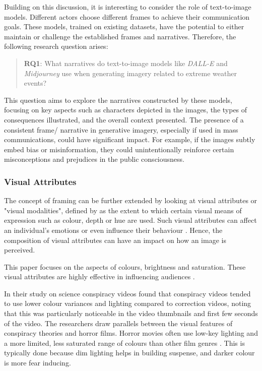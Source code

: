Building on this discussion, it is interesting to consider the role of text-to-image models. Different actors choose different frames to achieve their communication goals. These models, trained on existing datasets, have the potential to either maintain or challenge the established frames and narratives. Therefore, the following research question arises:

\begin{quote}
\textbf{RQ1}: What narratives do text-to-image models like \textit{DALL-E} and \textit{Midjourney} use when generating imagery related to extreme weather events? 
\end{quote}

This question aims to explore the narratives constructed by these models, focusing on key aspects such as characters depicted in the images, the types of consequences illustrated, and the overall context presented. The presence of a consistent frame/ narrative in generative imagery, especially if used in mass communications, could have significant impact. For example, if the images subtly embed bias or misinformation, they could unintentionally reinforce certain misconceptions and prejudices in the public consciousness.

\subsubsection{Visual Attributes }

The concept of framing can be further extended by looking at visual attributes or "visual modalities", defined by \textcite[256]{Kress2020} as the extent to which certain visual means of expression such as colour, depth or hue are used. Such visual attributes can affect an individual's emotions \parencite{Valdez1994} or even influence their behaviour \parencite{Meier2012}. Hence, the composition of visual attributes can have an impact on how an image is perceived.

This paper focuses on the aspects of colours, brightness and saturation. These visual attributes are highly effective in influencing audiences \parencite{Garber2003}.

In their study on science conspiracy videos \textcite{Chen2022} found that conspiracy videos tended to use lower colour variances and lighting compared to correction videos, noting that this was particularly noticeable in the video thumbnails and first few seconds of the video. The researchers draw parallels between the visual features of conspiracy theories and horror films. Horror movies often use low-key lighting and a more limited, less saturated range of colours than other film genres \parencite{Rasheed2005}. This is typically done because dim lighting helps in building suspense, and darker colour is more fear inducing. 

